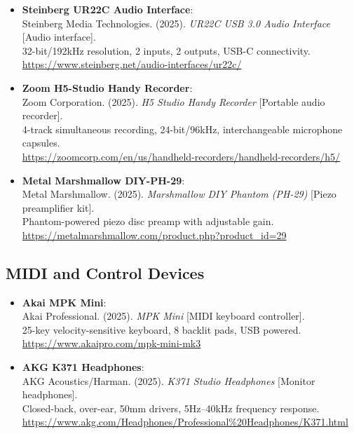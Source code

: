 \begin{itemize}[topsep=0pt, partopsep=0pt, parsep=0pt, itemsep=6pt]
	\item \textbf{Steinberg UR22C Audio Interface}: \\ 
	Steinberg Media Technologies. (2025). \textit{UR22C USB 3.0 Audio Interface} [Audio interface].\\ 
	32-bit/192kHz resolution, 2 inputs, 2 outputs, USB-C connectivity.\\
	\url{https://www.steinberg.net/audio-interfaces/ur22c/}
	
	\item \textbf{Zoom H5-Studio Handy Recorder}: \\ 
	Zoom Corporation. (2025). \textit{H5 Studio Handy Recorder} [Portable audio recorder].\\ 
	4-track simultaneous recording, 24-bit/96kHz, interchangeable microphone capsules.\\
	\url{https://zoomcorp.com/en/us/handheld-recorders/handheld-recorders/h5/}
	
	\item \textbf{Metal Marshmallow DIY-PH-29}: \\ 
	Metal Marshmallow. (2025). \textit{Marshmallow DIY Phantom (PH-29)} [Piezo preamplifier kit].\\ 
	Phantom-powered piezo disc preamp with adjustable gain.\\
	\url{https://metalmarshmallow.com/product.php?product_id=29}
\end{itemize}

\subsection*{MIDI and Control Devices}

\begin{itemize}[topsep=0pt, partopsep=0pt, parsep=0pt, itemsep=6pt]
	\item \textbf{Akai MPK Mini}: \\ 
	Akai Professional. (2025). \textit{MPK Mini} [MIDI keyboard controller].\\ 
	25-key velocity-sensitive keyboard, 8 backlit pads, USB powered.\\
	\url{https://www.akaipro.com/mpk-mini-mk3}
	
	\item \textbf{AKG K371 Headphones}: \\ 
	AKG Acoustics/Harman. (2025). \textit{K371 Studio Headphones} [Monitor headphones].\\ 
	Closed-back, over-ear, 50mm drivers, 5Hz–40kHz frequency response.\\
	\url{https://www.akg.com/Headphones/Professional%20Headphones/K371.html}
\end{itemize}


